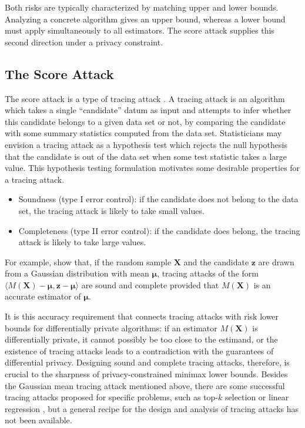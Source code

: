 \documentclass[letterpaper,12pt]{article}
\numberwithin{equation}{section}
\theoremstyle{plain}
\numberwithin{Theorem}{section}
\numberwithin{proposition}{section}
\numberwithin{Lemma}{section}
{
	\theoremstyle{definition}
	\newtheorem{Definition}{Definition}
	\newtheorem{example}{Example}
	\numberwithin{example}{section}
	\newtheorem{fact}{Fact}
	\numberwithin{fact}{section}
	\newtheorem{remark}{Remark}
}
\newcommand{\rev}[1]{#1}
\newcommand{\1}{\mathbbm{1}}
\def\bmu{{\boldsymbol{\mu}}}
\begin{document}
Both risks are typically characterized by matching upper and lower bounds. Analyzing a concrete algorithm gives an upper bound, whereas a lower bound must apply simultaneously to all estimators. The score attack supplies this second direction under a privacy constraint.


\subsection{The Score Attack}\label{sec: general lb}

The score attack is a type of tracing attack \cite{bun2014fingerprinting, dwork2015robust, dwork2017exposed}. A tracing attack is an algorithm which takes a single ``candidate'' datum as input and attempts to infer whether this candidate belongs to a given data set or not, by comparing the candidate with some summary statistics computed from the data set. Statisticians may envision a tracing attack as a hypothesis test which rejects the null hypothesis that the candidate is out of the data set when some test statistic takes a large value. This hypothesis testing formulation motivates some desirable properties for a tracing attack.
\begin{itemize}
	\item Soundness (type I error control): if the candidate does not belong to the data set, the tracing attack is likely to \rev{take} small values. 
	\item Completeness (type II error control): if the candidate does belong, the tracing attack is likely to take large values.
\end{itemize}
For example, \cite{dwork2015robust, kamath2018privately, cai2021cost} show that, if the random sample $\bm X$ and the candidate $\bm z$ are drawn from a Gaussian distribution with mean $\bmu$, tracing attacks of the form $\langle M(\bm X) - \bmu, \bm z - \bmu \rangle$ \rev{are} sound and complete provided that $M(\bm X)$ is an accurate estimator of $\bmu$. 

It is this accuracy requirement that connects tracing attacks with risk lower bounds for differentially private algorithms: if an estimator $M(\bm X)$ is differentially private, it cannot possibly be too close to the estimand, or the existence of tracing attacks leads to a contradiction with the guarantees of differential privacy. Designing sound and complete tracing attacks, therefore, is crucial to the sharpness of privacy-constrained minimax lower bounds. Besides the Gaussian mean tracing attack mentioned above, there are some successful tracing attacks proposed for specific problems, such as top-$k$ selection \cite{steinke2017tight} or linear regression \cite{cai2021cost}, but a general recipe for the design and analysis of tracing attacks has not been available. 
\end{document}
